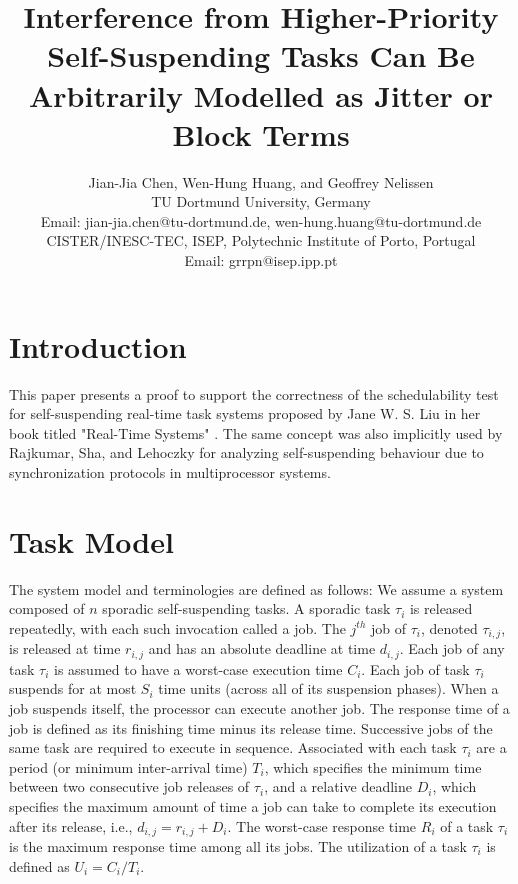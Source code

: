 \documentclass[10pt,conference]{IEEEtran}
\begin{document}
\title{\LARGE Interference from Higher-Priority Self-Suspending Tasks Can Be
  Arbitrarily Modelled as Jitter or Block Terms}

\author{Jian-Jia Chen, Wen-Hung Huang, and Geoffrey Nelissen\\
TU Dortmund University, Germany\\
Email: jian-jia.chen@tu-dortmund.de, wen-hung.huang@tu-dortmund.de\\
CISTER/INESC-TEC, ISEP, Polytechnic Institute of Porto, Portugal \\
Email: grrpn@isep.ipp.pt
}

\maketitle

\begin{abstract}
  
\end{abstract}

\section{Introduction}

This paper presents a proof to support the correctness of the
schedulability test for self-suspending real-time task systems proposed by Jane
W. S. Liu in her book titled "Real-Time Systems" \cite[Pages 164-165]{Liu:2000:RS:518501}.
The same concept was also implicitly used by Rajkumar, Sha, and
Lehoczky \cite[Page 267]{DBLP:conf/rtss/RajkumarSL88} for analyzing
self-suspending behaviour due to synchronization protocols in
multiprocessor systems. 


\section{Task Model}




The system model and terminologies are defined as follows: We assume a system composed of $n$ sporadic self-suspending tasks. A sporadic task $\tau_i$ is released repeatedly, with each such invocation called a
job. The $j^{th}$ job of $\tau_i$, denoted $\tau_{i,j}$, is released
at time $r_{i,j}$ and has an absolute deadline at time $d_{i,j}$. Each
job of any task $\tau_i$ is assumed to have a worst-case execution time $C_i$. Each job of task $\tau_i$ 
suspends for at most $S_i$ time units (across all of its suspension phases). When a job suspends itself, 
the processor can execute another job. 
The response time
of a job is defined as its finishing time minus its release
time. Successive jobs of the same task are required to execute in
sequence. Associated with each task $\tau_i$ are a period (or minimum inter-arrival time) $T_i$, which
specifies the minimum time between two consecutive job releases of
$\tau_i$, and a relative deadline $D_i$, which specifies the maximum amount of time a job can take to complete its execution after its release, i.e., $d_{i,j}=r_{i,j}+D_i$. The worst-case response
time $R_i$ of a task $\tau_i$ is the maximum response time among all its
jobs.  The utilization of a task $\tau_i$ is defined as $U_i=C_i/T_i$.
\end{document}
